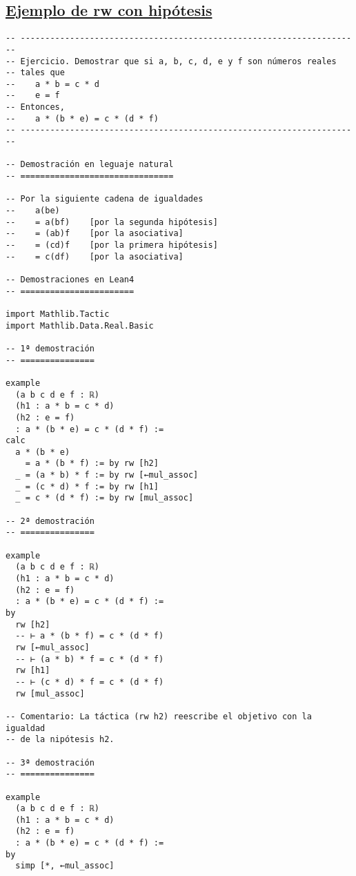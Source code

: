 \subsection{\href{./src/Basicos/Ejemplo\_de\_rw\_sobre\_hipotesis.lean}{Ejemplo de rw con hipótesis}}
\label{sec:org6215985}
\begin{verbatim}
-- ---------------------------------------------------------------------
-- Ejercicio. Demostrar que si a, b, c, d, e y f son números reales
-- tales que
--    a * b = c * d
--    e = f
-- Entonces,
--    a * (b * e) = c * (d * f)
-- ---------------------------------------------------------------------

-- Demostración en leguaje natural
-- ===============================

-- Por la siguiente cadena de igualdades
--    a(be)
--    = a(bf)    [por la segunda hipótesis]
--    = (ab)f    [por la asociativa]
--    = (cd)f    [por la primera hipótesis]
--    = c(df)    [por la asociativa]

-- Demostraciones en Lean4
-- =======================

import Mathlib.Tactic
import Mathlib.Data.Real.Basic

-- 1ª demostración
-- ===============

example
  (a b c d e f : ℝ)
  (h1 : a * b = c * d)
  (h2 : e = f)
  : a * (b * e) = c * (d * f) :=
calc
  a * (b * e)
    = a * (b * f) := by rw [h2]
  _ = (a * b) * f := by rw [←mul_assoc]
  _ = (c * d) * f := by rw [h1]
  _ = c * (d * f) := by rw [mul_assoc]

-- 2ª demostración
-- ===============

example
  (a b c d e f : ℝ)
  (h1 : a * b = c * d)
  (h2 : e = f)
  : a * (b * e) = c * (d * f) :=
by
  rw [h2]
  -- ⊢ a * (b * f) = c * (d * f)
  rw [←mul_assoc]
  -- ⊢ (a * b) * f = c * (d * f)
  rw [h1]
  -- ⊢ (c * d) * f = c * (d * f)
  rw [mul_assoc]

-- Comentario: La táctica (rw h2) reescribe el objetivo con la igualdad
-- de la nipótesis h2.

-- 3ª demostración
-- ===============

example
  (a b c d e f : ℝ)
  (h1 : a * b = c * d)
  (h2 : e = f)
  : a * (b * e) = c * (d * f) :=
by
  simp [*, ←mul_assoc]
\end{verbatim}


